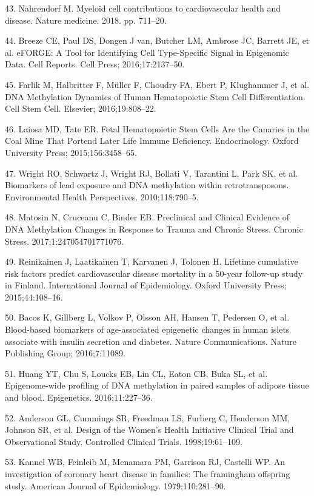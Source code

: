 \documentclass[]{bmcart}
\begin{document}
43. Nahrendorf M. Myeloid cell contributions to cardiovascular health
and disease. Nature medicine. 2018. pp. 711--20.

44. Breeze CE, Paul DS, Dongen J van, Butcher LM, Ambrose JC, Barrett
JE, et al. eFORGE: A Tool for Identifying Cell Type-Specific Signal in
Epigenomic Data. Cell Reports. Cell Press; 2016;17:2137--50.

45. Farlik M, Halbritter F, M{ü}ller F, Choudry FA, Ebert P, Klughammer
J, et al. DNA Methylation Dynamics of Human Hematopoietic Stem Cell
Differentiation. Cell Stem Cell. Elsevier; 2016;19:808--22.

46. Laiosa MD, Tate ER. Fetal Hematopoietic Stem Cells Are the Canaries
in the Coal Mine That Portend Later Life Immune Deficiency.
Endocrinology. Oxford University Press; 2015;156:3458--65.

47. Wright RO, Schwartz J, Wright RJ, Bollati V, Tarantini L, Park SK,
et al. Biomarkers of lead exposure and DNA methylation within
retrotransposons. Environmental Health Perspectives. 2010;118:790--5.

48. Matosin N, Cruceanu C, Binder EB. Preclinical and Clinical Evidence
of DNA Methylation Changes in Response to Trauma and Chronic Stress.
Chronic Stress. 2017;1:247054701771076.

49. Reinikainen J, Laatikainen T, Karvanen J, Tolonen H. Lifetime
cumulative risk factors predict cardiovascular disease mortality in a
50-year follow-up study in Finland. International Journal of
Epidemiology. Oxford University Press; 2015;44:108--16.

50. Bacos K, Gillberg L, Volkov P, Olsson AH, Hansen T, Pedersen O, et
al. Blood-based biomarkers of age-associated epigenetic changes in human
islets associate with insulin secretion and diabetes. Nature
Communications. Nature Publishing Group; 2016;7:11089.

51. Huang YT, Chu S, Loucks EB, Lin CL, Eaton CB, Buka SL, et al.
Epigenome-wide profiling of DNA methylation in paired samples of adipose
tissue and blood. Epigenetics. 2016;11:227--36.

52. Anderson GL, Cummings SR, Freedman LS, Furberg C, Henderson MM,
Johnson SR, et al. Design of the Women's Health Initiative Clinical
Trial and Observational Study. Controlled Clinical Trials.
1998;19:61--109.

53. Kannel WB, Feinleib M, Mcnamara PM, Garrison RJ, Castelli WP. An
investigation of coronary heart disease in families: The framingham
offspring study. American Journal of Epidemiology. 1979;110:281--90.
\end{document}
